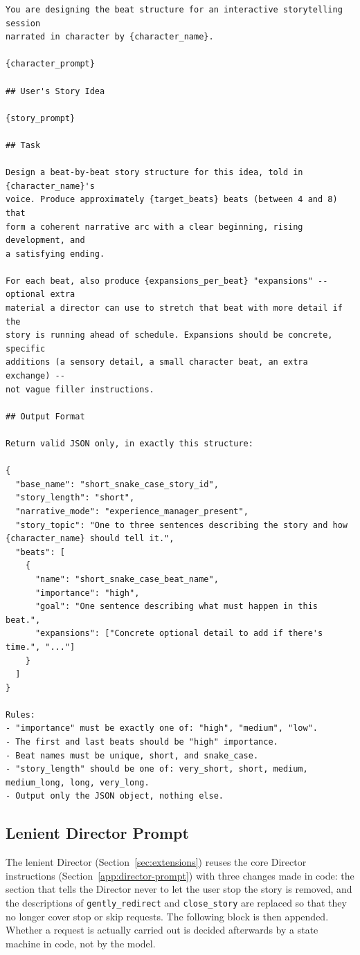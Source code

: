 \begin{lstlisting}
You are designing the beat structure for an interactive storytelling session
narrated in character by {character_name}.

{character_prompt}

## User's Story Idea

{story_prompt}

## Task

Design a beat-by-beat story structure for this idea, told in {character_name}'s
voice. Produce approximately {target_beats} beats (between 4 and 8) that
form a coherent narrative arc with a clear beginning, rising development, and
a satisfying ending.

For each beat, also produce {expansions_per_beat} "expansions" -- optional extra
material a director can use to stretch that beat with more detail if the
story is running ahead of schedule. Expansions should be concrete, specific
additions (a sensory detail, a small character beat, an extra exchange) --
not vague filler instructions.

## Output Format

Return valid JSON only, in exactly this structure:

{
  "base_name": "short_snake_case_story_id",
  "story_length": "short",
  "narrative_mode": "experience_manager_present",
  "story_topic": "One to three sentences describing the story and how {character_name} should tell it.",
  "beats": [
    {
      "name": "short_snake_case_beat_name",
      "importance": "high",
      "goal": "One sentence describing what must happen in this beat.",
      "expansions": ["Concrete optional detail to add if there's time.", "..."]
    }
  ]
}

Rules:
- "importance" must be exactly one of: "high", "medium", "low".
- The first and last beats should be "high" importance.
- Beat names must be unique, short, and snake_case.
- "story_length" should be one of: very_short, short, medium, medium_long, long, very_long.
- Output only the JSON object, nothing else.
\end{lstlisting}

\subsection{Lenient Director Prompt}
\label{app:lenient-prompt}

The lenient Director (Section~\ref{sec:extensions}) reuses the core Director
instructions (Section~\ref{app:director-prompt}) with three changes made in
code: the section that tells the Director never to let the user stop the
story is removed, and the descriptions of \texttt{gently\_redirect} and
\texttt{close\_story} are replaced so that they no longer cover stop or
skip requests. The following block is then appended. Whether a request is
actually carried out is decided afterwards by a state machine in code, not
by the model.

